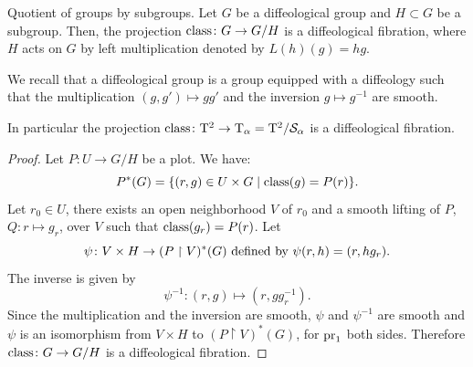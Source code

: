 \begin{Article}{Quotient of groups by subgroups.}{}
  Let $G$ be a diffeological group and $H \subset G$ be a subgroup.
  Then,
  the projection $\operatorname{class} \colon G \to G/H$ is a diffeological fibration,
  where $H$ acts on $G$ by left multiplication denoted by $L(h)(g) = hg$.

   We recall that a diffeological group is a group equipped with a diffeology such that the multiplication $(g,g') \mapsto gg'$ and the inversion $g \mapsto g^{-1}$ are smooth.

   In particular the projection $\operatorname{class} \colon \mathrm{T}^2 \to \mathrm{T}_\alpha = \mathrm{T}^2/\mathcal{S}_\alpha$ is a diffeological fibration.
\end{Article}

\begin{proof}
  Let $P \colon U \to G/H$ be a plot.
  We have:
  $$%
    P^*(G) = \{(r,g) \in U \times G \mid \Class(g) = P(r) \}.
  $$%
  Let $r_0 \in U$,
  there exists an open neighborhood $V$ of $r_0$ and a smooth lifting of $P$,
  $Q \colon r \mapsto g_r$,
  over $V$ such that $\operatorname{class}(g_r) = P(r)$.
  Let
  $$%
    \psi \colon V \times H \to (P \restriction V)^*(G)
    \SpacedText{defined by}
    \psi(r,h) = (r,hg_r).
  $$%
  The inverse is given by
  $$%
    \psi^{-1} \colon (r,g) \mapsto (r,gg_r^{-1}).
  $$%
  Since the multiplication and the inversion are smooth,
  $\psi$ and $\psi^{-1}$ are smooth and $\psi$ is an isomorphism from $V \times H$ to $(P \restriction V)^*(G)$,
  for $\operatorname{pr}_1$ both sides.
  Therefore $\operatorname{class} \colon G \to G/H$ is a diffeological fibration.
\end{proof}

